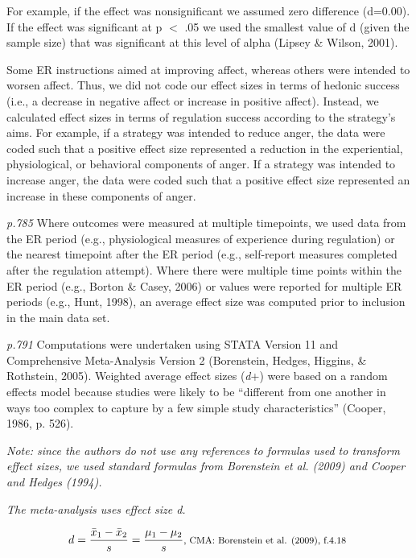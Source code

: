 \documentclass{article}
\begin{document}
For example, if the effect was nonsignificant we assumed zero difference (d=0.00). If the effect was significant at p $<$ .05 we used the smallest value of d (given the sample size) that was significant at this level of alpha (Lipsey \& Wilson, 2001).

Some ER instructions aimed at improving affect, whereas others were intended to worsen affect. Thus, we did not code our effect sizes in terms of hedonic success (i.e., a decrease in negative affect or increase in positive affect). Instead, we calculated effect sizes in terms of regulation success according to the strategy’s aims. For example, if a strategy was intended to reduce anger, the data were coded such that a positive effect size represented a reduction in the experiential, physiological, or behavioral components of anger. If a strategy was intended to increase anger, the data were coded such that a positive effect size represented an increase in these components of anger.

\textit{p.785} Where outcomes were measured at multiple timepoints, we used data from the ER period (e.g., physiological measures of experience during regulation) or the nearest timepoint after the ER period (e.g., self-report measures completed after the regulation attempt). Where there were multiple time points within the ER period (e.g., Borton \& Casey, 2006) or values were reported for multiple ER periods (e.g., Hunt, 1998), an average effect size was computed prior to inclusion in the main data set.

\textit{p.791} Computations were undertaken using STATA Version 11 and Comprehensive Meta-Analysis Version 2 (Borenstein, Hedges,  Higgins, \& Rothstein, 2005). Weighted average effect sizes (\textit{d}+) were based on a random effects model because studies were likely to be “different from one another in ways too complex to capture by a few simple study characteristics” (Cooper, 1986, p. 526).

\vspace{3 mm}
\textit{Note: since the authors do not use any references to formulas used to transform effect sizes, we used standard formulas from Borenstein et al. (2009) and Cooper and Hedges (1994).}

\vspace{3mm}
\textit{The meta-analysis uses effect size d.}

\begin{equation*}
d={\frac {{\bar {x}}_{1}-{\bar {x}}_{2}}{s}}={\frac {\mu_{1}-\mu_{2}}{s}} \mbox{\footnotesize, CMA: Borenstein et al. (2009), f.4.18 } 
\end{equation*}
\end{document}

